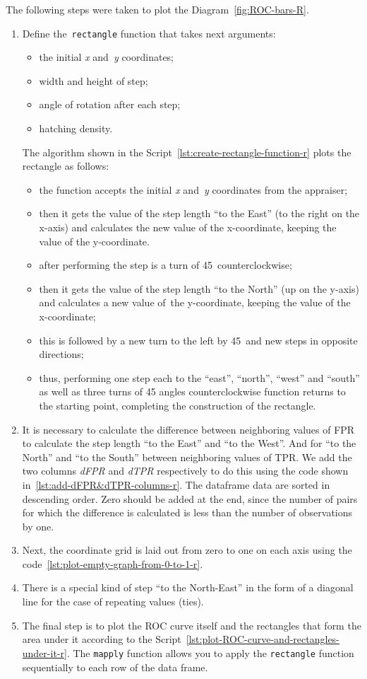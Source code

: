 \documentclass[]{scrreprt}
\begin{document}
The following steps were taken to plot the Diagram~\ref{fig:ROC-bars-R}.
\begin{enumerate}
	\item Define the~\texttt{rectangle} function that takes next arguments:
	\begin{itemize}
		\item the initial \emph{x} and~\emph{y} coordinates;
		\item width and height of step;
		\item angle of rotation after each step;
		\item hatching density.
	\end{itemize}
	The algorithm shown in the Script~\ref{lst:create-rectangle-function-r} plots the rectangle as follows:
	\begin{itemize}
		\item the function accepts the initial \emph{x} and~\emph{y} coordinates from the appraiser;
		\item then it gets the value of the step length ``to the East'' (to the right on the x-axis) and calculates the new value of the x-coordinate, keeping the value of the y-coordinate.
		\item after performing the step is a turn of 45\textdegree \ counterclockwise;
		\item then it gets the value of the step length ``to the North'' (up on the y-axis) and calculates a new value of~the y-coordinate, keeping the value of the x-coordinate;
		\item this is followed by a new turn to the left by 45\textdegree \ and new steps in opposite directions;
		\item thus, performing one step each to the ``east'', ``north'', ``west'' and ``south'' as well as three turns of 45 angles counterclockwise function returns to the starting point, completing the construction of the rectangle.
	\end{itemize}
	\item It is necessary to calculate the difference between neighboring values of FPR to calculate the step length ``to the East'' and ``to the West''. And for ``to the North'' and ``to the South'' between neighboring values of TPR. We add the two columns \emph{dFPR} and \emph{dTPR} respectively to do this using the code shown in~\ref{lst:add-dFPR&dTPR-columns-r}. The dataframe data are sorted in descending order. Zero should be added at the end, since the number of pairs for which the difference is calculated is less than the number of observations by one.
	\item Next, the coordinate grid is laid out from zero to one on each axis using the code~\ref{lst:plot-empty-graph-from-0-to-1-r}.
	\item There is a special kind of step ``to the North-East'' in the form of a diagonal line for the case of repeating values (ties).
	\item The final step is to plot the ROC curve itself and the rectangles that form the area under it according to the Script~\ref{lst:plot-ROC-curve-and-rectangles-under-it-r}. The \texttt{mapply} function allows you to apply the \texttt{rectangle} function sequentially to each row of the data frame.
\end{enumerate}
\end{document}
